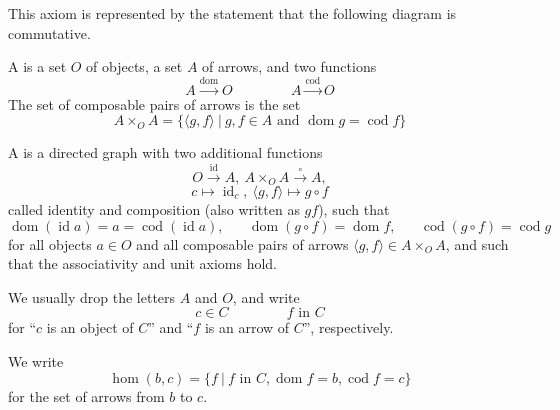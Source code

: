 \documentclass{mathnotes}
\DeclareMathOperator{\dom}{dom}
\DeclareMathOperator{\cod}{cod}
\DeclareMathOperator{\id}{id}
\begin{document}
\begin{defi}
\begin{itemize}
            This axiom is represented by the statement that the following
            diagram is commutative.
            \begin{center}
            \end{center}
    \end{itemize}
\end{defi}

\begin{defi}
    A  is a set $O$ of objects, a set $A$ of arrows, and
    two functions
    \[A\xrightarrow{\dom}O\hspace{50pt}A\xrightarrow{\cod}O\]
    The set of composable pairs of arrows is the set
    \[A\times_OA=\{\langle g,f\rangle\ |\ g,f\in A
        \text{ and }\dom g=\cod f\}\]
\end{defi}

\begin{bdefi}
    A  is a directed graph with two additional functions
    \[O\xrightarrow{\id}A,\ A\times_OA\xrightarrow{\circ}A,\]
    \[c\mapsto\id_c,\ \langle g,f\rangle\mapsto g\circ f\]
    called identity and composition (also written as $gf$), such that
    \[\dom(\id a)=a=\cod(\id a),\hspace{20pt}\dom(g\circ
    f)=\dom f,\hspace{20pt}\cod(g\circ f)=\cod g\]
    for all objects $a\in O$ and all composable pairs of arrows $\langle
    g,f\rangle\in A\times_OA$, and such that the associativity and unit axioms
    hold.
\end{bdefi}

\begin{note}
    We usually drop the letters $A$ and $O$, and write
    \[c\in C\hspace{50pt}f\text{ in }C\]
    for ``$c$ is an object of $C$'' and ``$f$ is an arrow of $C$'',
    respectively.
\end{note}

\begin{defi}
    We write
    \[\hom(b,c)=\{f\ |\ f\text{ in }C,\dom f=b, \cod f=c\}\]
    for the set of arrows from $b$ to $c$.
\end{defi}
\end{document}
